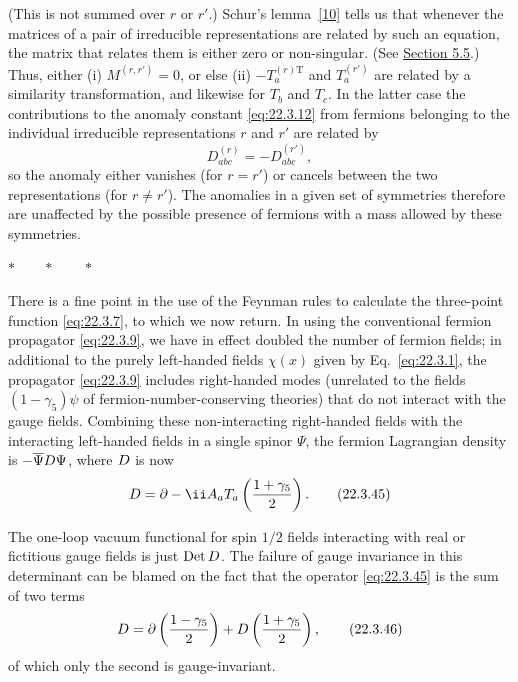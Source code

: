 (This is not summed over $r$ or $r'$.) Schur's
lemma~\hyperref[ch22-ref-10]{[10]} tells us that whenever the matrices of a
pair of irreducible representations are related by such an equation, the
matrix that relates them is either zero or non-singular. (See
\hyperref[sec:5.5]{Section 5.5}.) Thus, either (i) $M^{(r,r')}=0$, or else
(ii) $-T_a^{(r)\mathrm T}$ and $T_a^{(r')}$ are related by a
similarity transformation, and likewise for $T_b$ and $T_c$. In
the latter case the contributions to the anomaly constant
\eqref{eq:22.3.12} from fermions belonging to the individual irreducible
representations $r$ and $r'$ are related by
\begin{equation}
 D_{abc}^{(r)}
 =-D_{abc}^{(r')},
 \tag{22.3.44}\label{eq:22.3.44}
\end{equation}
so the anomaly either vanishes (for $r=r'$) or cancels between the two
representations (for $r\ne r'$). The anomalies in a given set of
symmetries therefore are unaffected by the possible presence of fermions
with a mass allowed by these symmetries.

\begin{center}
 $\ast\qquad\ast\qquad\ast$
\end{center}

There is a fine point in the use of the Feynman rules to calculate the
three-point function \eqref{eq:22.3.7}, to which we now return. In using the
conventional fermion propagator \eqref{eq:22.3.9}, we have in effect
doubled the number of fermion fields; in additional to the purely
left-handed fields $\chi(x)$ given by Eq.~\eqref{eq:22.3.1}, the propagator
\eqref{eq:22.3.9} includes right-handed modes (unrelated to the fields
$(1-\gamma_5)\psi$ of fermion-number-conserving theories) that do not
interact with the gauge fields. Combining these non-interacting
right-handed fields with the interacting left-handed fields in a single
spinor $\Psi$, the fermion Lagrangian density is
$-\overline\Psi\sl{D}\Psi$, where $\sl{D}$ is now
\begin{equation}
 \sl{D}=\sl{\partial}
 -\ii A_a T_a\left(\frac{1+\gamma_5}{2}\right).
 \tag{22.3.45}\label{eq:22.3.45}
\end{equation}

The one-loop vacuum functional for spin $1/2$ fields interacting with real
or fictitious gauge fields is just $\operatorname{Det}\sl{D}$. The failure
of gauge invariance in this determinant can be blamed on the fact that the
operator \eqref{eq:22.3.45} is the sum of two terms
\begin{equation}
 \sl{D}
 =\sl{\partial}\left(\frac{1-\gamma_5}{2}\right)
 +\sl{D}\left(\frac{1+\gamma_5}{2}\right),
 \tag{22.3.46}\label{eq:22.3.46}
\end{equation}
of which only the second is gauge-invariant.

